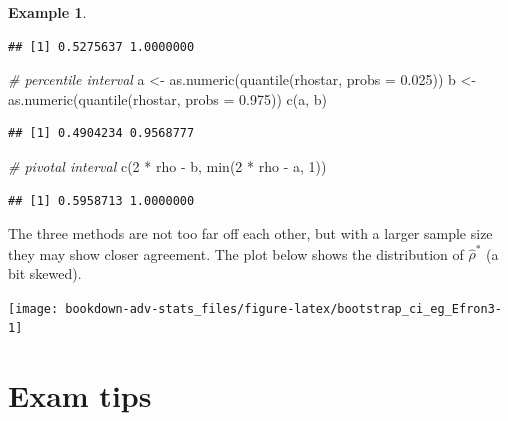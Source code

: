 \documentclass[
]{book}
\newenvironment{Shaded}{\begin{snugshade}}{\end{snugshade}}
\newcommand{\AttributeTok}[1]{\textcolor[rgb]{0.77,0.63,0.00}{#1}}
\newcommand{\CommentTok}[1]{\textcolor[rgb]{0.56,0.35,0.01}{\textit{#1}}}
\newcommand{\DecValTok}[1]{\textcolor[rgb]{0.00,0.00,0.81}{#1}}
\newcommand{\FloatTok}[1]{\textcolor[rgb]{0.00,0.00,0.81}{#1}}
\newcommand{\FunctionTok}[1]{\textcolor[rgb]{0.00,0.00,0.00}{#1}}
\newcommand{\NormalTok}[1]{#1}
\newcommand{\OtherTok}[1]{\textcolor[rgb]{0.56,0.35,0.01}{#1}}
\newcommand{\SpecialCharTok}[1]{\textcolor[rgb]{0.00,0.00,0.00}{#1}}
\theoremstyle{definition}
\theoremstyle{definition}
\newtheorem{example}{Example}[chapter]
\theoremstyle{definition}
\theoremstyle{definition}
\theoremstyle{remark}
\begin{document}
\begin{example}
\begin{verbatim}
## [1] 0.5275637 1.0000000
\end{verbatim}

\begin{Shaded}
\begin{Highlighting}[]
\CommentTok{\# percentile interval}
\NormalTok{a }\OtherTok{\textless{}{-}} \FunctionTok{as.numeric}\NormalTok{(}\FunctionTok{quantile}\NormalTok{(rhostar, }\AttributeTok{probs =} \FloatTok{0.025}\NormalTok{))}
\NormalTok{b }\OtherTok{\textless{}{-}} \FunctionTok{as.numeric}\NormalTok{(}\FunctionTok{quantile}\NormalTok{(rhostar, }\AttributeTok{probs =} \FloatTok{0.975}\NormalTok{))}
\FunctionTok{c}\NormalTok{(a, b)}
\end{Highlighting}
\end{Shaded}

\begin{verbatim}
## [1] 0.4904234 0.9568777
\end{verbatim}

\begin{Shaded}
\begin{Highlighting}[]
\CommentTok{\# pivotal interval}
\FunctionTok{c}\NormalTok{(}\DecValTok{2} \SpecialCharTok{*}\NormalTok{ rho }\SpecialCharTok{{-}}\NormalTok{ b, }\FunctionTok{min}\NormalTok{(}\DecValTok{2} \SpecialCharTok{*}\NormalTok{ rho }\SpecialCharTok{{-}}\NormalTok{ a, }\DecValTok{1}\NormalTok{))}
\end{Highlighting}
\end{Shaded}

\begin{verbatim}
## [1] 0.5958713 1.0000000
\end{verbatim}

The three methods are not too far off each other, but with a larger sample size they may show closer agreement. The plot below shows the distribution of \(\hat\rho^*\) (a bit skewed).

\begin{center}\texttt{[image: bookdown-adv-stats\_files/figure-latex/bootstrap\_ci\_eg\_Efron3-1]} \end{center}

\end{example}

\hypertarget{appendix-appendix}{%
\appendix}


\hypertarget{exam-tips}{%
\chapter{Exam tips}\label{exam-tips}}

  
\end{document}
